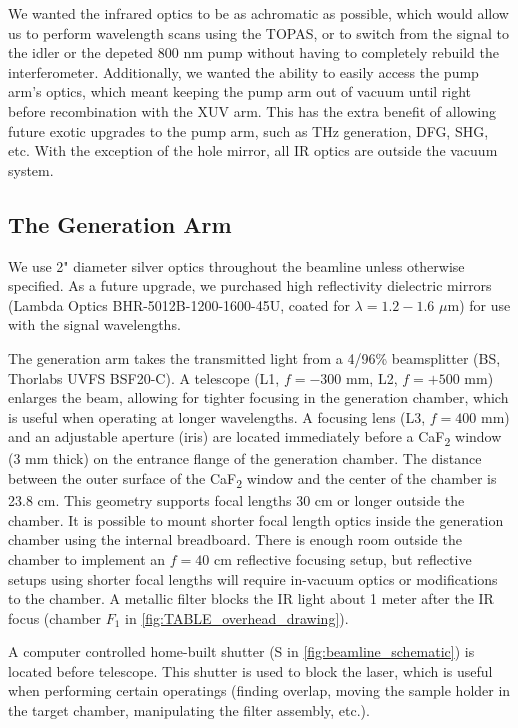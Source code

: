 We wanted the infrared optics to be as achromatic as possible, which would allow us to perform wavelength scans using the TOPAS, or to switch from the signal to the idler or the depeted 800 nm pump without having to completely rebuild the interferometer. Additionally, we wanted the ability to easily access the pump arm's optics, which meant keeping the pump arm out of vacuum until right before recombination with the XUV arm. This has the extra benefit of allowing future exotic upgrades to the pump arm, such as THz generation, DFG, SHG, etc. With the exception of the hole mirror, all IR optics are outside the vacuum system. 

\subsection{The Generation Arm}

We use 2" diameter silver optics throughout the beamline unless otherwise specified. As a future upgrade, we purchased high reflectivity dielectric mirrors (Lambda Optics BHR-5012B-1200-1600-45U, coated for $\lambda = 1.2 - 1.6$ $\mu$m) for use with the signal wavelengths.

The generation arm takes the transmitted light from a 4/96\% beamsplitter (BS, Thorlabs UVFS BSF20-C). A telescope (L1, $f = - 300$ mm, L2, $f = + 500$ mm) enlarges the beam, allowing for tighter focusing in the generation chamber, which is useful when operating at longer wavelengths. A focusing lens (L3, $f= 400$ mm) and an adjustable aperture (iris) are located immediately before a CaF\textsubscript{2} window (3 mm thick) on the entrance flange of the generation chamber. The distance between the outer surface of the CaF\textsubscript{2} window and the center of the chamber is 23.8 cm. This geometry supports focal lengths 30 cm or longer outside the chamber. It is possible to mount shorter focal length optics inside the generation chamber using the internal breadboard. There is enough room outside the chamber to implement an $f = 40$ cm reflective focusing setup, but reflective setups using shorter focal lengths will require in-vacuum optics or modifications to the chamber. A metallic filter blocks the IR light about 1 meter after the IR focus (chamber $F_1$ in \cref{fig:TABLE_overhead_drawing}).

A computer controlled home-built shutter (S in \cref{fig:beamline_schematic}) is located before telescope. This shutter is used to block the laser, which is useful when performing certain operatings (finding overlap, moving the sample holder in the target chamber, manipulating the filter assembly, etc.).


